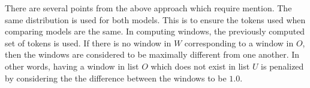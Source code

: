 %
There are several points from the above approach which require mention.
%
The same distribution is used for both models.
This is to ensure the tokens used when comparing models are the same.
%
In computing windows, 
the previously computed set of tokens is used.
%
%
If there is no window in $W$ corresponding to a window in $O$,
then the windows are considered to be maximally different from one another.
In other words,
having a window in list $O$ which does not exist in list $U$ is
penalized by considering the the difference between the windows to be $1.0$.




